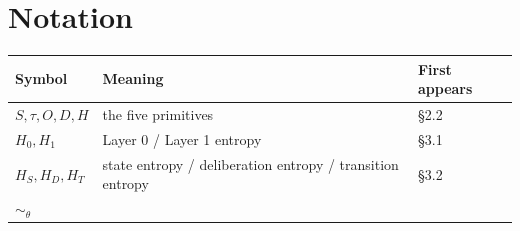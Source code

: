 \documentclass[11pt]{article}
\begin{document}
\hypertarget{notation}{%
\section{Notation}\label{notation}}

\begin{longtable}[]{@{}lll@{}}
\toprule
\begin{minipage}[b]{0.30\columnwidth}\raggedright
Symbol\strut
\end{minipage} & \begin{minipage}[b]{0.30\columnwidth}\raggedright
Meaning\strut
\end{minipage} & \begin{minipage}[b]{0.30\columnwidth}\raggedright
First appears\strut
\end{minipage}\tabularnewline
\midrule
\endhead
\begin{minipage}[t]{0.30\columnwidth}\raggedright
\(S,\tau,O,D,H\)\strut
\end{minipage} & \begin{minipage}[t]{0.30\columnwidth}\raggedright
the five primitives\strut
\end{minipage} & \begin{minipage}[t]{0.30\columnwidth}\raggedright
\S{}2.2\strut
\end{minipage}\tabularnewline
\begin{minipage}[t]{0.30\columnwidth}\raggedright
\(H_0,H_1\)\strut
\end{minipage} & \begin{minipage}[t]{0.30\columnwidth}\raggedright
Layer 0 / Layer 1 entropy\strut
\end{minipage} & \begin{minipage}[t]{0.30\columnwidth}\raggedright
\S{}3.1\strut
\end{minipage}\tabularnewline
\begin{minipage}[t]{0.30\columnwidth}\raggedright
\(H_S,H_D,H_T\)\strut
\end{minipage} & \begin{minipage}[t]{0.30\columnwidth}\raggedright
state entropy / deliberation entropy / transition entropy\strut
\end{minipage} & \begin{minipage}[t]{0.30\columnwidth}\raggedright
\S{}3.2\strut
\end{minipage}\tabularnewline
\begin{minipage}[t]{0.30\columnwidth}\raggedright
\(\sim_\theta\)\strut
\end{minipage} & \begin{minipage}[t]{0.30\columnwidth}\raggedright

\end{minipage}
\end{longtable}
\end{document}
